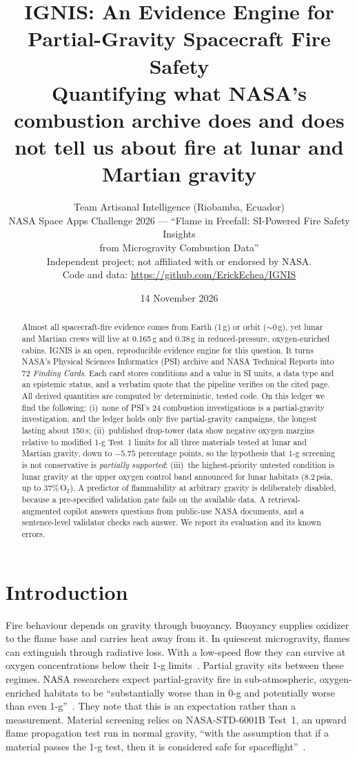\documentclass[10pt]{article}
\title{\textbf{IGNIS: An Evidence Engine for Partial-Gravity Spacecraft Fire Safety}\\[2pt]
\large Quantifying what NASA's combustion archive does and does not tell us about fire at lunar and Martian gravity}
\author{Team Artisanal Intelligence (Riobamba, Ecuador)\\
\small NASA Space Apps Challenge 2026 --- ``Flame in Freefall: SI-Powered Fire Safety Insights\\
\small from Microgravity Combustion Data''\\
\small Independent project; not affiliated with or endorsed by NASA.\\
\small Code and data: \url{https://github.com/ErickEchea/IGNIS}}
\date{14 November 2026}
\begin{document}
\maketitle

\begin{abstract}
Almost all spacecraft-fire evidence comes from Earth (1\,g) or orbit ($\sim$0\,g), yet lunar and Martian crews
will live at 0.165\,g and 0.38\,g in reduced-pressure, oxygen-enriched cabins. IGNIS is an open, reproducible
evidence engine for this question. It turns NASA's Physical Sciences Informatics (PSI) archive and NASA Technical
Reports into 72 \emph{Finding Cards}. Each card stores conditions and a value in SI units, a data type and an
epistemic status, and a verbatim quote that the pipeline verifies on the cited page. All derived quantities are
computed by deterministic, tested code. On this ledger we find the following:
(i)~none of PSI's 24 combustion investigations is a partial-gravity investigation, and the ledger holds only five
partial-gravity campaigns, the longest lasting about 150\,s;
(ii)~published drop-tower data show negative oxygen margins relative to modified 1-g Test~1 limits for all three
materials tested at lunar and Martian gravity, down to $-5.75$ percentage points, so the hypothesis that 1-g
screening is not conservative is \emph{partially supported};
(iii)~the highest-priority untested condition is lunar gravity at the upper oxygen control band announced for
lunar habitats (8.2\,psia, up to 37\%\,O$_2$).
A predictor of flammability at arbitrary gravity is deliberately disabled, because a pre-specified validation
gate fails on the available data. A retrieval-augmented copilot answers questions from public-use NASA documents,
and a sentence-level validator checks each answer. We report its evaluation and its known errors.
\end{abstract}

\section{Introduction}
Fire behaviour depends on gravity through buoyancy. Buoyancy supplies oxidizer to the flame base and carries heat
away from it. In quiescent microgravity, flames can extinguish through radiative loss. With a low-speed flow they
can survive at oxygen concentrations below their 1-g limits~\cite{olson2012,ferkul2026a}. Partial gravity sits
between these regimes. NASA researchers expect partial-gravity fire in sub-atmospheric, oxygen-enriched habitats to
be ``substantially worse than in 0-g and potentially worse than even 1-g''~\cite{ferkul2026a}. They note that this
is an expectation rather than a measurement. Material screening relies on NASA-STD-6001B Test~1, an upward flame
propagation test run in normal gravity, ``with the assumption that if a material passes the 1-g test, then it is
considered safe for spaceflight''~\cite{ferkul2026a}.
\end{document}
